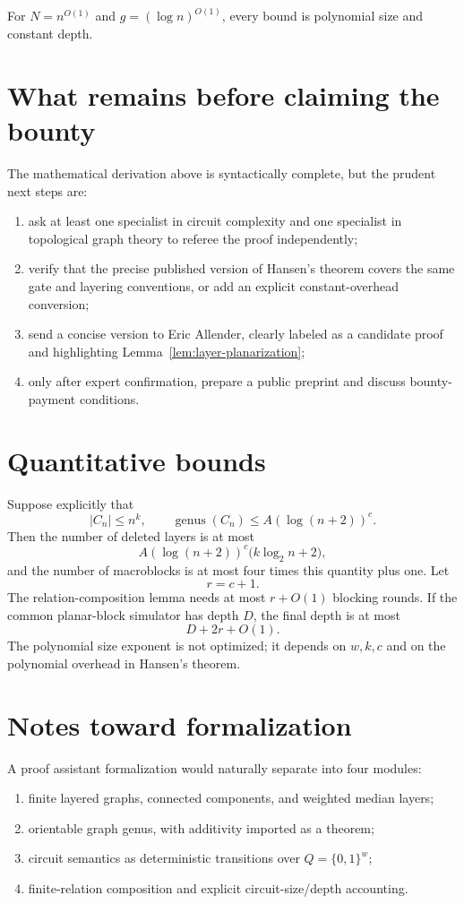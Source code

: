 \documentclass[11pt]{article}
\theoremstyle{definition}
\newcommand{\genus}{\operatorname{genus}}
\newcommand{\bits}{\{0,1\}}
\begin{document}
For $N=n^{O(1)}$ and $g=(\log n)^{O(1)}$, every bound is polynomial size and constant depth.

\section{What remains before claiming the bounty}

The mathematical derivation above is syntactically complete, but the prudent next steps are:
\begin{enumerate}
\item ask at least one specialist in circuit complexity and one specialist in topological graph theory to referee the proof independently;
\item verify that the precise published version of Hansen's theorem covers the same gate and layering conventions, or add an explicit constant-overhead conversion;
\item send a concise version to Eric Allender, clearly labeled as a candidate proof and highlighting Lemma~\ref{lem:layer-planarization};
\item only after expert confirmation, prepare a public preprint and discuss bounty-payment conditions.
\end{enumerate}

\appendix

\section{Quantitative bounds}

Suppose explicitly that
\[
  |C_n|\le n^k,\qquad
  \genus(C_n)\le A(\log(n+2))^c.
\]
Then the number of deleted layers is at most
\[
  A(\log(n+2))^c\bigl(k\log_2 n+2\bigr),
\]
and the number of macroblocks is at most four times this quantity plus one. Let
\[
  r=c+1.
\]
The relation-composition lemma needs at most $r+O(1)$ blocking rounds. If the common planar-block simulator has depth $D$, the final depth is at most
\[
  D+2r+O(1).
\]
The polynomial size exponent is not optimized; it depends on $w,k,c$ and on the polynomial overhead in Hansen's theorem.

\section{Notes toward formalization}

A proof assistant formalization would naturally separate into four modules:
\begin{enumerate}
\item finite layered graphs, connected components, and weighted median layers;
\item orientable graph genus, with additivity imported as a theorem;
\item circuit semantics as deterministic transitions over $Q=\bits^w$;
\item finite-relation composition and explicit circuit-size/depth accounting.
\end{enumerate}
\end{document}
